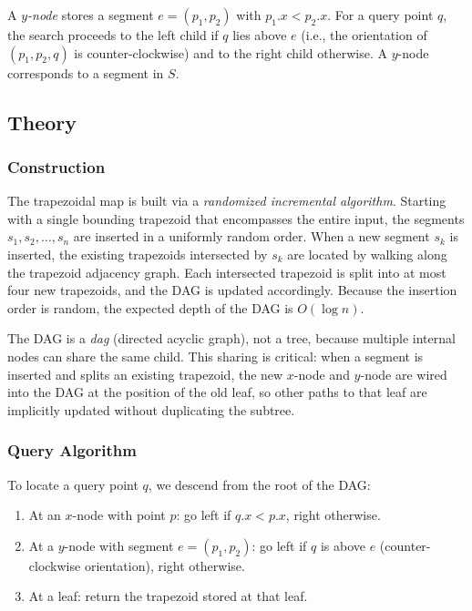 \begin{definition}[$y$-Node]\label{def:y_node}
A \emph{$y$-node} stores a segment $e = (p_1, p_2)$ with $p_1.x < p_2.x$. For a query point $q$, the search proceeds to the left child if $q$ lies above $e$ (i.e., the orientation of $(p_1, p_2, q)$ is counter-clockwise) and to the right child otherwise. A $y$-node corresponds to a segment in $S$.
\end{definition}

\subsection{Theory}

\subsubsection*{Construction}

The trapezoidal map is built via a \emph{randomized incremental algorithm}. Starting with a single bounding trapezoid that encompasses the entire input, the segments $s_1, s_2, \ldots, s_n$ are inserted in a uniformly random order. When a new segment $s_k$ is inserted, the existing trapezoids intersected by $s_k$ are located by walking along the trapezoid adjacency graph. Each intersected trapezoid is split into at most four new trapezoids, and the DAG is updated accordingly. Because the insertion order is random, the expected depth of the DAG is $O(\log n)$.

The DAG is a \emph{dag} (directed acyclic graph), not a tree, because multiple internal nodes can share the same child. This sharing is critical: when a segment is inserted and splits an existing trapezoid, the new $x$-node and $y$-node are wired into the DAG at the position of the old leaf, so other paths to that leaf are implicitly updated without duplicating the subtree.

\subsubsection*{Query Algorithm}

To locate a query point $q$, we descend from the root of the DAG:
\begin{enumerate}
\item At an $x$-node with point $p$: go left if $q.x < p.x$, right otherwise.
\item At a $y$-node with segment $e = (p_1, p_2)$: go left if $q$ is above $e$ (counter-clockwise orientation), right otherwise.
\item At a leaf: return the trapezoid stored at that leaf.
\end{enumerate}

